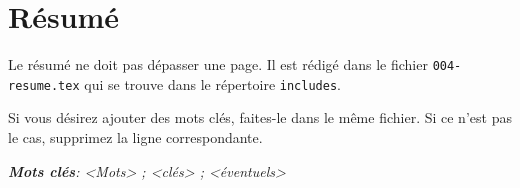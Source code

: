 
\newpage

\section*{Résumé} %
  
Le résumé ne doit pas dépasser une page. Il est rédigé dans le fichier \texttt{004-resume.tex} qui se trouve dans le répertoire \texttt{includes}.

Si vous désirez ajouter des mots clés, faites-le dans le même fichier. Si ce n'est pas le cas, supprimez la ligne correspondante.

\bigskip

\textbf{\emph{Mots clés}}\emph{: <Mots> ; <clés> ; <éventuels>}



